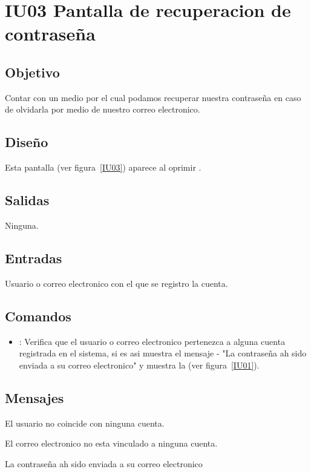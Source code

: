 \section{IU03 Pantalla de recuperacion de contraseña}

\subsection{Objetivo}
	Contar con un medio por el cual podamos recuperar nuestra contraseña en caso de olvidarla por medio de nuestro correo electronico.

\subsection{Diseño}
	Esta pantalla  (ver figura~\ref{IU03}) aparece al oprimir .


\subsection{Salidas}

	Ninguna.

\subsection{Entradas}
Usuario o correo electronico con el que se registro la cuenta.

\subsection{Comandos}
\begin{itemize}
	\item {}: Verifica que el usuario o correo electronico pertenezca a alguna cuenta registrada en el sistema, si es asi muestra el mensaje - "La contraseña ah sido enviada a su correo electronico" y muestra la  (ver figura~\ref{IU01}).
\end{itemize}

\subsection{Mensajes}

\begin{Citemize}
	\item El usuario no coincide con ninguna cuenta.
	\item El correo electronico no esta vinculado a ninguna cuenta.
	\item La contraseña ah sido enviada a su correo electronico
\end{Citemize}

\clearpage